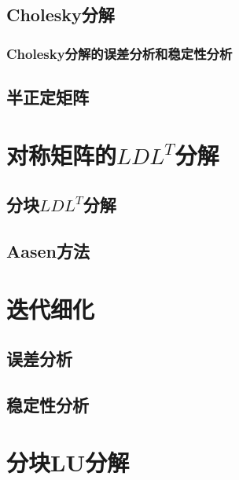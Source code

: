 \documentclass[a4paper,10pt]{ctexart}
\begin{document}
\subsection{Cholesky分解}

\subsubsection{Cholesky分解的误差分析和稳定性分析}

\subsection{半正定矩阵}

\section{对称矩阵的\texorpdfstring{$ LDL^T $}{LDL-T}分解}

\subsection{分块\texorpdfstring{$ LDL^T $}{LDL-T}分解}

\subsection{Aasen方法}

\section{迭代细化}

\subsection{误差分析}

\subsection{稳定性分析}

\section{分块LU分解}


\end{document}
